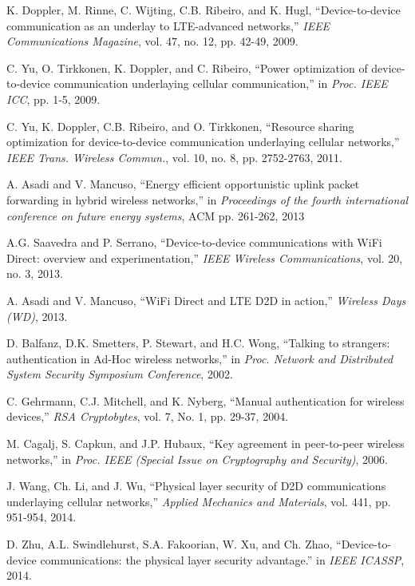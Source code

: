 \documentclass[conference]{IEEEtran}
\begin{document}

\begin{thebibliography}{99}

K. Doppler, M. Rinne, C. Wijting, C.B. Ribeiro, and K. Hugl, ``Device-to-device communication as an underlay to LTE-advanced networks,''  \emph{IEEE Communications Magazine}, vol. 47, no. 12, pp. 42-49, 2009.

C. Yu, O. Tirkkonen, K. Doppler, and C. Ribeiro, ``Power optimization of device-to-device communication underlaying cellular communication,'' in \emph{Proc. IEEE ICC}, pp. 1-5, 2009.

C. Yu, K. Doppler, C.B. Ribeiro, and O. Tirkkonen, ``Resource sharing optimization for device-to-device communication underlaying cellular networks,'' \emph{IEEE Trans. Wireless Commun.}, vol. 10, no. 8, pp. 2752-2763, 2011.


A. Asadi and V. Mancuso, ``Energy efficient opportunistic uplink packet forwarding in hybrid wireless networks,'' in \emph{Proceedings of the fourth international conference on future energy systems}, ACM pp. 261-262, 2013

A.G. Saavedra and P. Serrano, ``Device-to-device communications with WiFi Direct: overview and experimentation,'' \emph{IEEE Wireless Communications}, vol. 20, no. 3, 2013.

A. Asadi and V. Mancuso, ``WiFi Direct and LTE D2D in action,'' \emph{Wireless Days (WD)}, 2013.

D. Balfanz, D.K. Smetters, P. Stewart, and H.C. Wong, ``Talking to strangers: authentication in Ad-Hoc wireless networks,'' in \emph{Proc. Network and Distributed System Security Symposium Conference}, 2002.

C. Gehrmann, C.J. Mitchell, and K. Nyberg, ``Manual authentication for wireless devices,'' \emph{RSA Cryptobytes}, vol. 7, No. 1, pp. 29-37, 2004.

M. Cagalj, S. Capkun, and J.P. Hubaux, ``Key agreement in peer-to-peer wireless networks,'' in \emph{Proc. IEEE (Special Issue on Cryptography and Security)}, 2006.

J. Wang, Ch. Li, and J. Wu, ``Physical layer security of D2D communications underlaying cellular networks,'' \emph{Applied Mechanics and Materials}, vol. 441, pp. 951-954, 2014.

D. Zhu, A.L. Swindlehurst, S.A. Fakoorian, W. Xu, and Ch. Zhao, ``Device-to-device communications: the physical layer security advantage.'' in \emph{IEEE ICASSP}, 2014.


\end{thebibliography}
\end{document}
